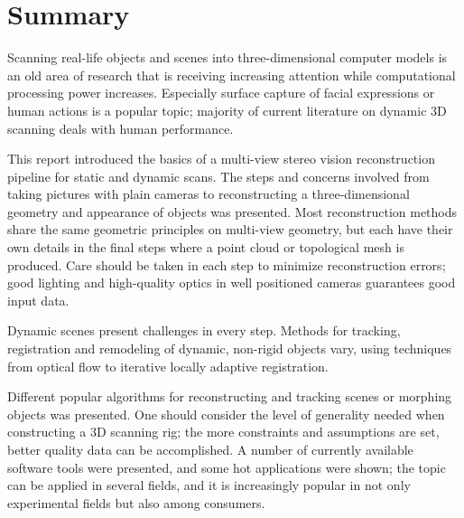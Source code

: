 \section{Summary}

Scanning real-life objects and scenes into three-dimensional computer models is an old area of research that is receiving increasing attention while computational processing power increases.
Especially surface capture of facial expressions or human actions is a popular topic; majority of current literature on dynamic 3D scanning deals with human performance.

This report introduced the basics of a multi-view stereo vision reconstruction pipeline for static and dynamic scans.
The steps and concerns involved from taking pictures with plain cameras to reconstructing a three-dimensional geometry and appearance of objects was presented.
Most reconstruction methods share the same geometric principles on multi-view geometry, but each have their own details in the final steps where a point cloud or topological mesh is produced.
Care should be taken in each step to minimize reconstruction errors; good lighting and high-quality optics in well positioned cameras guarantees good input data.

Dynamic scenes present challenges in every step. Methods for tracking, registration and remodeling of dynamic, non-rigid objects vary, using techniques from optical flow to iterative locally adaptive registration.

Different popular algorithms for reconstructing and tracking scenes or morphing objects was presented.
One should consider the level of generality needed when constructing a 3D scanning rig; the more constraints and assumptions are set, better quality data can be accomplished.
A number of currently available software tools were presented, and some hot applications were shown; the topic can be applied in several fields, and it is increasingly popular in not only experimental fields but also among consumers.
